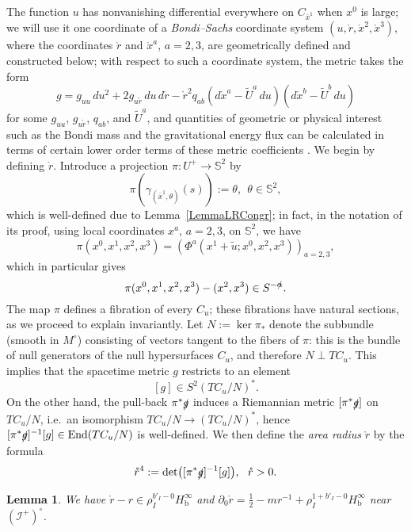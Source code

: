 \documentclass[reqno,11pt,letterpaper]{amsart}
\numberwithin{equation}{section}
\numberwithin{figure}{section}
\newtheorem{lemma}[thm]{Lemma}
\theoremstyle{definition}
\theoremstyle{remark}
\newcommand{\ms}{\mathscr}
\newcommand{\scri}{\ms I}
\newcommand{\Sph}{\mathbb{S}}
\newcommand{\slg}{\slashed{g}{}}
\newcommand{\slalpha}{\slashed{\alpha}{}}
\newcommand{\End}{\operatorname{End}}
\newcommand{\pa}{\partial}
\newcommand{\wt}{\widetilde}
\newcommand{\bop}{{\mathrm{b}}}
\newcommand{\half}{\tfrac{1}{2}}
\newcommand{\Hb}{H_{\bop}}
\begin{document}
The function $u$ has nonvanishing differential everywhere on $C_{\bar x^1}$ when $x^0$ is large; we will use it one coordinate of a \emph{Bondi--Sachs} coordinate system $(u,\mathring r,\mathring x^2,\mathring x^3)$, where the coordinates $\mathring r$ and $\mathring x^a$, $a=2,3$, are geometrically defined and constructed below; with respect to such a coordinate system, the metric takes the form
\[
  g = g_{u u}\,d u^2 + 2 g_{u\mathring r}\,d u\,d\mathring r - \mathring r^2 q_{a b}(d\mathring x^a-\wt U^a\,d u)(d\mathring x^b-\wt U^b\,d u)
\]
for some $g_{u u}$, $g_{u \mathring r}$, $q_{a b}$, and $\wt U^a$, and quantities of geometric or physical interest such as the Bondi mass and the gravitational energy flux can be calculated in terms of certain lower order terms of these metric coefficients \cite{BondivdBMetznerGravity,MaedlerWinicourBondi}. We begin by defining $\mathring r$. Introduce a projection $\pi\colon U^+\to\Sph^2$ by
\[
  \pi(\gamma_{(\bar x^1,\theta)}(s)) := \theta,\ \ \theta\in\Sph^2,
\]
which is well-defined due to Lemma~\ref{LemmaLRCongr}; in fact, in the notation of its proof, using local coordinates $x^a$, $a=2,3$, on $\Sph^2$, we have
\begin{equation}
\label{EqLBSProjExpl}
  \pi(x^0,x^1,x^2,x^3)=(\Phi^a(x^1+\wt u;x^0,x^2,x^3))_{a=2,3},
\end{equation}
which in particular gives
\begin{equation}
\label{EqLBSProj}
  \pi(x^0,x^1,x^2,x^3)-(x^2,x^3)\in S^{-\slalpha}.
\end{equation}
The map $\pi$ defines a fibration of every $C_u$; these fibrations have natural sections, as we proceed to explain invariantly. Let $N:=\ker\pi_*$ denote the subbundle (smooth in $M^\circ$) consisting of vectors tangent to the fibers of $\pi$: this is the bundle of null generators of the null hypersurfaces $C_u$, and therefore $N \perp T C_u$. This implies that the spacetime metric $g$ restricts to an element
\[
  [g]\in S^2(T C_u/N)^*.
\]
On the other hand, the pull-back $\pi^*\slg$ induces a Riemannian metric $[\pi^*\slg]$ on $T C_u/N$, i.e.\ an isomorphism $T C_u/N\to(T C_u/N)^*$, hence $[\pi^*\slg]^{-1}[g]\in\End(T C_u/N)$ is well-defined. We then define the \emph{area radius} $\mathring r$ by the formula
\[
  \mathring r^4 := \det\bigl([\pi^*\slg]^{-1}[g]\bigr),\ \ \mathring r>0.
\]
\begin{lemma}
\label{LemmaLBSAreaR}
  We have $\mathring r-r\in\rho_I^{b'_I-0}\Hb^\infty$ and $\pa_0\mathring r=\half-m r^{-1}+\rho_I^{1+b'_I-0}\Hb^\infty$ near $(\scri^+)^\circ$.
\end{lemma}
\end{document}
